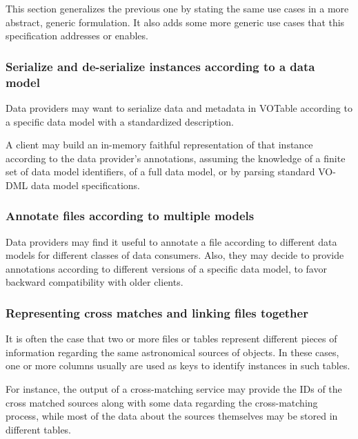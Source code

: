 \documentclass[11pt,a4paper]{ivoa}
\begin{document}
This section generalizes the previous one by stating the same use cases
in a more abstract, generic formulation. It also adds some more generic
use cases that this specification addresses or enables.

\subsubsection{Serialize and de-serialize instances according to a data
model}\label{serialize-and-de-serialize-instances-according-to-a-data-model}

Data providers may want to serialize data and metadata in VOTable
according to a specific data model with a standardized description.

A client may build an in-memory faithful representation of that instance
according to the data provider's annotations, assuming the knowledge of
a finite set of data model identifiers, of a full data model, or by
parsing standard VO-DML data model specifications.

\subsubsection{Annotate files according to multiple
models}\label{annotate-files-according-to-multiple-models}

Data providers may find it useful to annotate a file according to
different data models for different classes of data consumers. Also,
they may decide to provide annotations according to different versions
of a specific data model, to favor backward compatibility with older
clients.

\subsubsection{Representing cross matches and linking files
together}\label{representing-cross-matches-and-linking-files-together}

It is often the case that two or more files or tables represent
different pieces of information regarding the same astronomical sources
of objects. In these cases, one or more columns usually are used as keys
to identify instances in such tables.

For instance, the output of a cross-matching service may provide the IDs
of the cross matched sources along with some data regarding the
cross-matching process, while most of the data about the sources
themselves may be stored in different tables.
\end{document}
